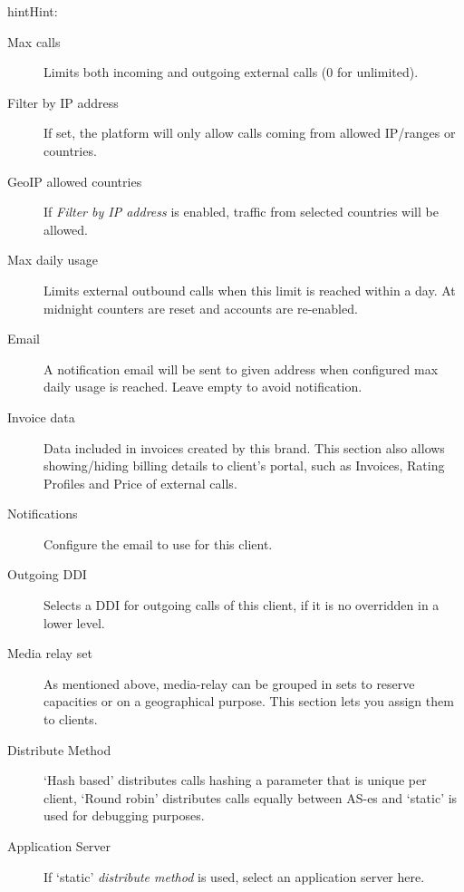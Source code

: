 \documentclass[letterpaper,10pt,english]{sphinxmanual}
\begin{document}
\begin{notice}{hint}{Hint:}
\begin{description}
\item[{Max calls}] \leavevmode
Limits both incoming and outgoing external calls (0 for unlimited).

\item[{Filter by IP address}] \leavevmode
If set, the platform will only allow calls coming from allowed IP/ranges or countries.

\item[{GeoIP allowed countries}] \leavevmode
If \emph{Filter by IP address} is enabled, traffic from selected countries will be allowed.

\item[{Max daily usage}] \leavevmode
Limits external outbound calls when this limit is reached within a day. At midnight counters are reset and
accounts are re-enabled.

\item[{Email}] \leavevmode
A notification email will be sent to given address when configured max daily usage is reached. Leave empty to
avoid notification.

\item[{Invoice data}] \leavevmode
Data included in invoices created by this brand. This section also allows showing/hiding billing details to
client's portal, such as Invoices, Rating Profiles and Price of external calls.

\item[{Notifications}] \leavevmode
Configure the email {\hyperref[administration_portal/brand/settings/notification_templates:id1]{}} to use for this client.

\item[{Outgoing DDI}] \leavevmode
Selects a DDI for outgoing calls of this client, if it is no overridden in
a lower level.

\item[{Media relay set}] \leavevmode
As mentioned above, media-relay can be grouped in sets to reserve capacities
or on a geographical purpose. This section lets you assign them to clients.

\item[{Distribute Method}] \leavevmode
`Hash based' distributes calls hashing a parameter that is unique per
client, `Round robin' distributes calls equally between AS-es and
`static' is used for debugging purposes.

\item[{Application Server}] \leavevmode
If `static' \emph{distribute method} is used, select an application server here.


\end{description}
\end{notice}
\end{document}
